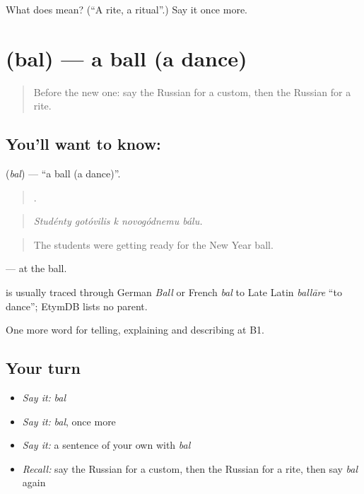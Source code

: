 \begin{tcolorbox}[breakable,colback=teal!4,colframe=teal!35!black,title={Before you move on}]
What does  mean? (\textquotedblleft{}A rite, a ritual\textquotedblright{}.) Say it once more.
\end{tcolorbox}
\section[\texorpdfstring{\ru{бал} (bal)}{бал (bal)}]{ (bal) — a ball (a dance)}

\label{lesson:RU-C318-bal}



\begin{quote}
Before the new one: say the Russian for a custom, then the Russian for a rite.
\end{quote}

\subsection*{You'll want to know: }
\textbf{} (\emph{bal}) — \textquotedblleft{}a ball (a dance)\textquotedblright{}.

\begin{quote}
    .
\end{quote}

\begin{quote}
\emph{Studénty gotóvilis k novogódnemu bálu.}
\end{quote}

\begin{quote}
The students were getting ready for the New Year ball.
\end{quote}

\emph{ } — at the ball.

\begin{cousinweb}
\emph{} is usually traced through German \emph{Ball} or French \emph{bal} to Late Latin \emph{ballāre} \textquotedblleft{}to dance\textquotedblright{}; EtymDB lists no parent.
\end{cousinweb}

\begin{grammarlens}[title={What you've built}]
One more word for telling, explaining and describing at B1.
\end{grammarlens}

\subsection*{Your turn}
\begin{itemize}
\raggedright
  \item \emph{Say it:} \emph{bal}
  \item \emph{Say it:} \emph{bal}, once more
  \item \emph{Say it:} a sentence of your own with \emph{bal}
  \item \emph{Recall:} say the Russian for a custom, then the Russian for a rite, then say \emph{bal} again
\end{itemize}

